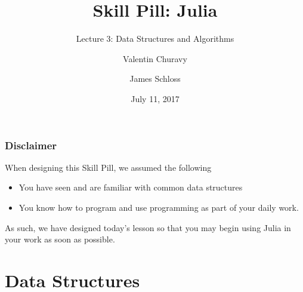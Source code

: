 \documentclass{beamer}
\title[Skill Pill]{Skill Pill: Julia} %
\subtitle{Lecture 3: Data Structures and Algorithms}
\author{Valentin Churavy \and James Schloss} %
\institute[OIST] %
{
Okinawa Institute of Science and Technology \\ %
\textit{valentin.churavy@oist.jp} \\
\textit{james.schloss@oist.jp} %
}
\date{July 11, 2017} %
\begin{document}

\begin{frame}
\vspace*{1.4cm}
\titlepage %
\end{frame}



\begin{frame}
  \tableofcontents
\end{frame}

\begin{frame}
\frametitle{Disclaimer}

When designing this Skill Pill, we assumed the following
\begin{itemize}
\item You have seen and are familiar with common data structures
\item You know how to program and use programming as part of your daily work. 
\end{itemize}

As such, we have designed today's lesson so that you may begin using Julia in your work as soon as possible.

\end{frame}
\section{Data Structures}
\end{document}
